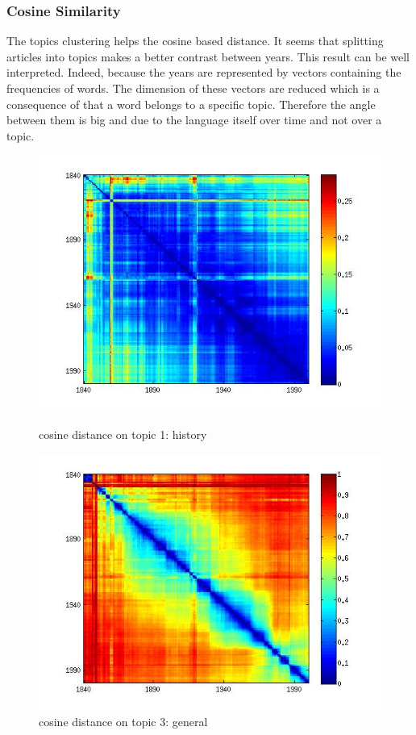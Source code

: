 \subsubsection{Cosine Similarity}

The topics clustering helps the cosine based distance. It seems that splitting articles into topics makes a better contrast between years. This result can be well interpreted. Indeed, because the years are represented by vectors containing the frequencies of words. The dimension of these vectors are reduced which is a consequence of that a word belongs to a specific topic. Therefore the angle between them is big and due to the language itself over time and not over a topic. 

\begin{figure}[H]
    \begin{minipage}[b]{0.48\linewidth}
        \includegraphics[scale=0.3]{Pictures/topics/cos/topic1.jpg}
        \caption{cosine distance on topic 1: history}
        \label{cos_topic1}
    \end{minipage}\hfill
    \begin{minipage}[b]{0.5\linewidth}
        \includegraphics[scale=0.3]{Pictures/topics/cos/topic3.jpg}
        \caption{cosine distance on topic 3: general}
        \label{cos_topic3}
    \end{minipage}\hfill
\end{figure}

